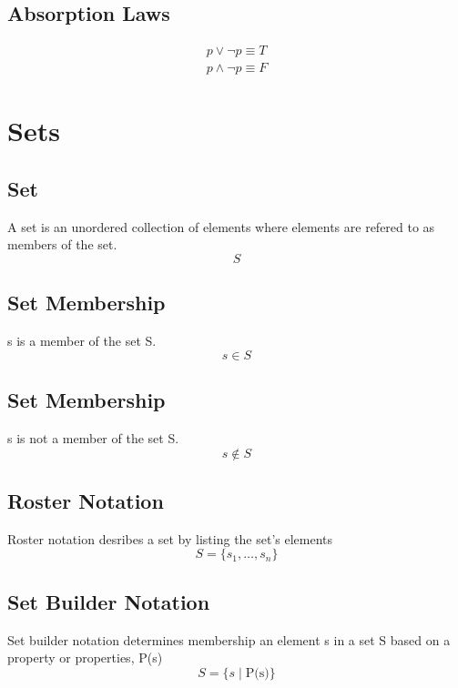 \documentclass[12pt]{article}
\begin{document}
\subsection{Absorption Laws}

\begin{subequations}\label{negation}
\begin{align}
p \lor \neg p\equiv T\label{neg_first}\\
p \wedge \neg p \equiv F\label{neg_second}
\end{align}
\end{subequations}


%
%
%
%
%
%
\pagebreak
\section{Sets}
\setcounter{equation}{0}

\subsection{Set}
A set is an unordered collection of elements where elements are refered to as members of the set.
\begin{equation}
S
\end{equation}

\subsection{Set Membership}
s is a member of the set S.
\begin{equation}
s \in S
\end{equation}

\subsection{Set Membership}
s is not a member of the set S.
\begin{equation}
s \not \in S
\end{equation}

\subsection{Roster Notation}
Roster notation desribes a set by listing the set's elements
\begin{equation}
S = \{s_1, \ldots, s_n\}
\end{equation}

\subsection{Set Builder Notation}
Set builder notation determines membership an element s in a set S based on a property or properties, P(s)
\begin{equation}
S = \{s\mid\text{P(s)}\}
\end{equation}
\end{document}
